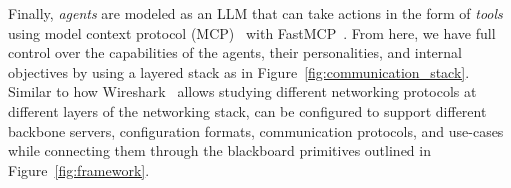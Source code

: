 Finally, \emph{agents} are modeled as an LLM that can take actions in the form of \emph{tools} using model context protocol (MCP)~\citep{hou2025model}
with FastMCP~\cite{githubGitHubJlowinfastmcp}. 
From here, we have full control over the capabilities of the agents, their personalities, and internal objectives by using a layered stack as in Figure~\ref{fig:communication_stack}. Similar to how Wireshark~\citep{wireshark} allows studying different networking protocols at different layers of the networking stack, \sys can be configured to support different backbone servers, configuration formats, communication protocols, and use-cases while connecting them through the blackboard primitives outlined in Figure~\ref{fig:framework}.




